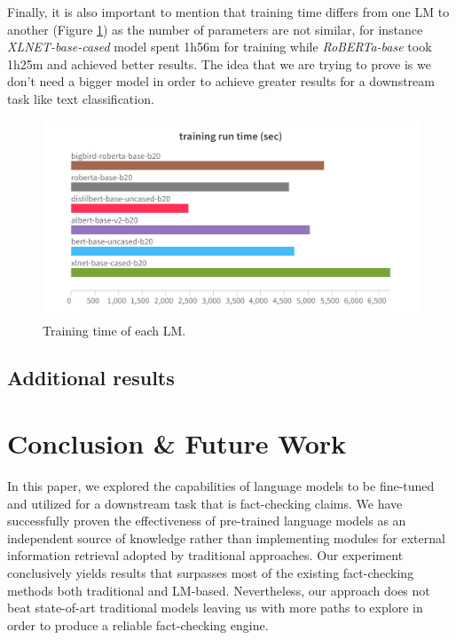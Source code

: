 \documentclass[10pt, english]{report}
\begin{document}
Finally, it is also important to mention that training time differs from one LM to another (Figure \ref{fig:train_time}) as the number of parameters are not similar, for instance \textit{XLNET-base-cased} model spent 1h56m for training while \textit{RoBERTa-base} took 1h25m and achieved better results. The idea that we are trying to prove is we don't need a bigger model in order to achieve greater results for a downstream task like text classification.

\begin{figure}[htp]
    \centering
    \includegraphics[scale=0.2]{img/train_time.png}
    \caption[Comparison]{Training time of each LM.}
    \label{fig:train_time}
\end{figure}

\section{Additional results}


\chapter{Conclusion \& Future Work}

In this paper, we explored the capabilities of language models to be fine-tuned and utilized for a downstream task that is fact-checking claims. We have successfully proven the effectiveness of pre-trained language models as an independent source of knowledge rather than implementing modules for external information retrieval adopted by traditional approaches. Our experiment conclusively yields results that surpasses most of the existing fact-checking methods both traditional and LM-based. Nevertheless, our approach does not beat state-of-art traditional models leaving us with more paths to explore in order to produce a reliable fact-checking engine.\\
\end{document}
